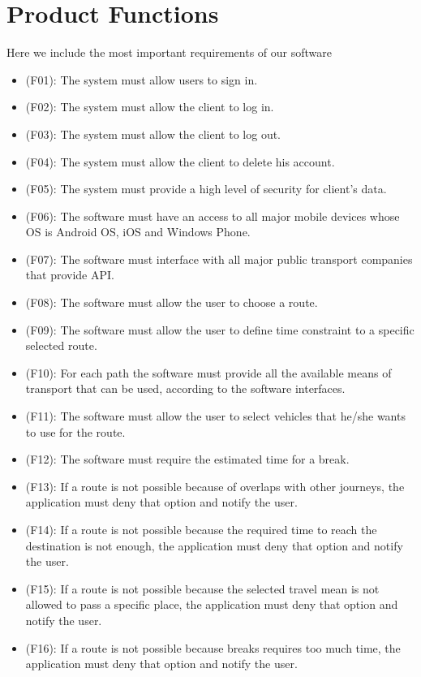 \documentclass[a4paper,leqno]{book}
\begin{document}
\newpage
\section{Product Functions}
Here we include the most important requirements of our software

\begin{itemize}
	
	\item (F01): The system must allow users to sign in.
	\item (F02): The system must allow the client to log in.
	\item (F03): The system must allow the client to log out.
	\item (F04): The system must allow the client to delete his account.
	\item (F05): The system must provide a high level of security for client's data.
	\item (F06): The software must have an access to all major mobile devices whose OS is Android OS, iOS and Windows Phone.
	\item (F07): The software must interface with all major public transport companies that provide API.
	\item (F08): The software must allow the user to choose a route.
	\item (F09): The software must allow the user to define time constraint to a specific selected route.
	\item (F10): For each path the software must provide all the available means of transport that can be used, according to the software interfaces.
	\item (F11): The software must allow the user to select vehicles that he/she wants to use for the route.
	\item (F12): The software must require the estimated time for a break.
	\item (F13): If a route is not possible because of overlaps with other journeys, the application must deny that option and notify the user.
	\item (F14): If a route is not possible because the required time to reach the destination is not enough, the application must deny that option and notify the user.
	\item (F15): If a route is not possible because the selected travel mean is not allowed to pass a specific place, the application must deny that option and notify the user.
	\item (F16): If a route is not possible because breaks requires too much time, the application must deny that option and notify the user.

\end{itemize}
\end{document}
